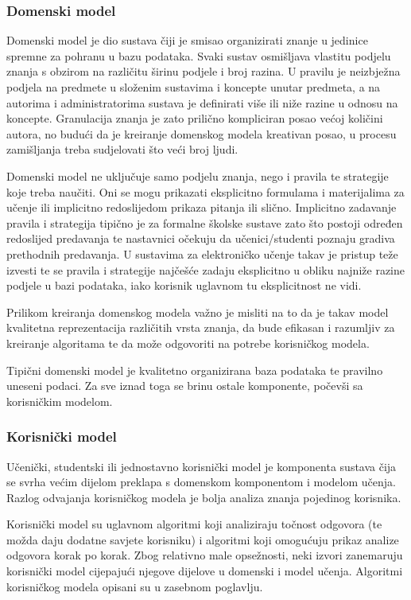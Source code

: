 \documentclass[times, utf8, zavrsni, numeric]{fer}
\begin{document}
\subsubsection{Domenski model}
Domenski model je dio sustava čiji je smisao organizirati znanje u jedinice spremne za pohranu u bazu podataka.\cite{markurban} Svaki sustav osmišljava vlastitu podjelu znanja s obzirom na različitu širinu podjele i broj razina. U pravilu je neizbježna podjela na predmete u složenim sustavima i koncepte unutar predmeta, a na autorima i administratorima sustava je definirati više ili niže razine u odnosu na koncepte. Granulacija znanja je zato prilično kompliciran posao većoj količini autora, no budući da je kreiranje domenskog modela kreativan posao, u procesu zamišljanja treba sudjelovati što veći broj ljudi.
\par
Domenski model ne uključuje samo podjelu znanja, nego i pravila te strategije koje treba naučiti. Oni se mogu prikazati eksplicitno formulama i materijalima za učenje ili implicitno redoslijedom prikaza pitanja ili slično. Implicitno zadavanje pravila i strategija tipično je za formalne školske sustave zato što postoji određen redoslijed predavanja te nastavnici očekuju da učenici/studenti poznaju gradiva prethodnih predavanja. U sustavima za elektroničko učenje takav je pristup teže izvesti te se pravila i strategije najčešće zadaju eksplicitno u obliku najniže razine podjele u bazi podataka, iako korisnik uglavnom tu eksplicitnost ne vidi.
\par
Prilikom kreiranja domenskog modela važno je misliti na to da je takav model kvalitetna reprezentacija različitih vrsta znanja, da bude efikasan i razumljiv za kreiranje algoritama te da može odgovoriti na potrebe korisničkog modela.
\par
Tipični domenski model je kvalitetno organizirana baza podataka te pravilno uneseni podaci. Za sve iznad toga se brinu ostale komponente, počevši sa korisničkim modelom.

\subsubsection{Korisnički model}
Učenički, studentski ili jednostavno korisnički model je komponenta sustava čija se svrha većim dijelom preklapa s domenskom komponentom i modelom učenja. Razlog odvajanja korisničkog modela je bolja analiza znanja pojedinog korisnika. 
\par
Korisnički model su uglavnom algoritmi koji analiziraju točnost odgovora (te možda daju dodatne savjete korisniku) i algoritmi koji omogućuju prikaz analize odgovora korak po korak.\cite{markurban} Zbog relativno male opsežnosti, neki izvori zanemaruju korisnički model cijepajući njegove dijelove u domenski i model učenja. Algoritmi korisničkog modela opisani su u zasebnom poglavlju.
\end{document}
